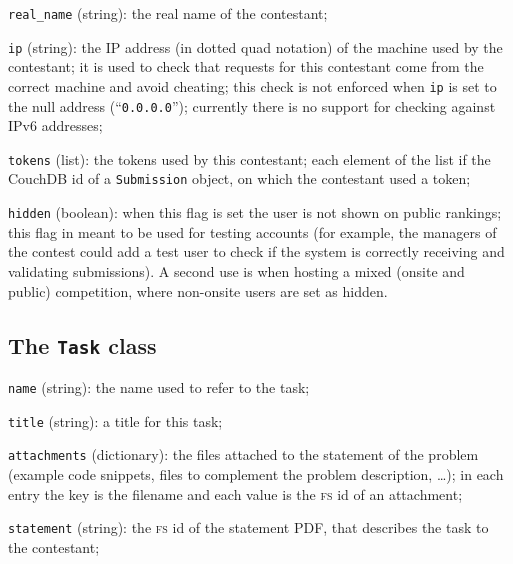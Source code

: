 \documentclass[a4paper,8pt]{amsart}
\newcommand{\FS}{\textsc{fs}}
\newenvironment{squishlist}{%
  \begin{list}{\textbullet}%
    { \setlength{\itemsep}{0pt}%
      \setlength{\parsep}{3pt}%
      \setlength{\topsep}{3pt}%
      \setlength{\partopsep}{0pt}%
      \setlength{\leftmargin}{1.5em}%
      \setlength{\labelwidth}{1em}%
      \setlength{\labelsep}{0.5em} }%
}{\end{list}}
\newcommand{\id}[1]{\texttt{#1}}
\begin{document}
\begin{multicols}{2}
\begin{squishlist}
  \item \id{real\_name} (string): the real name of the contestant;

  \item \id{ip} (string): the IP address (in dotted quad notation) of
    the machine used by the contestant; it is used to check that
    requests for this contestant come from the correct machine and
    avoid cheating; this check is not enforced when \id{ip} is set to
    the null address (``\texttt{0.0.0.0}''); currently there is no
    support for checking against IPv6 addresses;

  \item \id{tokens} (list): the tokens used by this contestant; each
    element of the list if the CouchDB id of a \id{Submission} object,
    on which the contestant used a token;

  \item \id{hidden} (boolean): when this flag is set the user is not
    shown on public rankings; this flag in meant to be used for
    testing accounts (for example, the managers of the contest could
    add a test user to check if the system is correctly receiving and
    validating submissions). A second use is when hosting a mixed
    (onsite and public) competition, where non-onsite users are set
    as hidden.

  \end{squishlist}

  \subsection{The \id{Task} class}

  \begin{squishlist}

  \item \id{name} (string): the name used to refer to the task;

  \item \id{title} (string): a title for this task;

  \item \id{attachments} (dictionary): the files attached to the
    statement of the problem (example code snippets, files to
    complement the problem description, \dots); in each entry the key
    is the filename and each value is the \FS{} id of an attachment;

  \item \id{statement} (string): the \FS{} id of the statement PDF,
    that describes the task to the contestant;


\end{squishlist}
\end{multicols}
\end{document}
